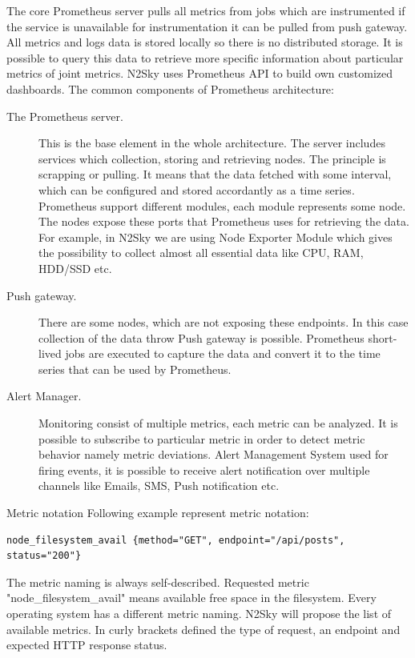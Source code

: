 The core Prometheus server pulls all metrics from jobs which are instrumented if the service is unavailable for instrumentation it can be pulled from push gateway. All metrics and logs data is stored locally so there is no distributed storage. It is possible to query this data to retrieve more specific information about particular metrics of joint metrics. N2Sky uses Prometheus API to build own customized dashboards. 
The common components of Prometheus architecture:
\begin{description}
\item[The Prometheus server.] This is the base element in the whole architecture. The server includes services which collection, storing and retrieving nodes. The principle is scrapping or pulling. It means that the data fetched with some interval, which can be configured and stored accordantly as a time series. Prometheus support different modules, each module represents some node. The nodes expose these ports that Prometheus uses for retrieving the data. For example, in N2Sky we are using Node Exporter Module which gives the possibility to collect almost all essential data like CPU, RAM, HDD/SSD etc.
\item[Push gateway.] There are some nodes, which are not exposing these endpoints. In this case collection of the data throw Push gateway is possible.  Prometheus short-lived jobs are executed to capture the data and convert it to the time series that can be used by Prometheus.
\item [Alert Manager.]  Monitoring consist of multiple metrics, each metric can be analyzed. It is possible to subscribe to particular metric in order to detect metric behavior namely metric deviations. Alert Management System used for firing events, it is possible to receive alert notification over multiple channels like Emails, SMS, Push notification etc.
\end{description}

Metric notation 
Following example represent metric notation:
\begin{lstlisting}
node_filesystem_avail {method="GET", endpoint="/api/posts", status="200"}
\end{lstlisting}

The metric naming is always self-described.  Requested metric "node\_filesystem\_avail" means available free space in the filesystem.  Every operating system has a different metric naming. N2Sky will propose the list of available metrics. In curly brackets defined the type of request, an endpoint and expected HTTP response status.

